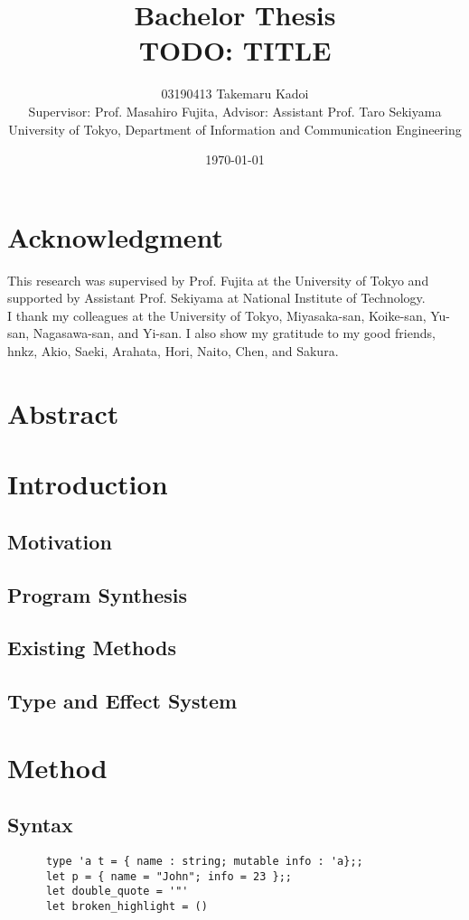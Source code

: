 \documentclass[12pt, a4paper, titlepage]{report}
\title{Bachelor Thesis \\ TODO: TITLE}
\author{
  03190413 Takemaru Kadoi
  \\[1cm]
  {\small Supervisor: Prof. Masahiro Fujita},
  {\small Advisor: Assistant Prof. Taro Sekiyama}
  \\[1cm]
  {\small University of Tokyo, Department of Information and Communication Engineering}
}
\date{\today}
\begin{document}
\maketitle
\newpage
\tableofcontents
\newpage

\chapter*{Acknowledgment}
This research was supervised by Prof. Fujita at the University of Tokyo and supported by Assistant Prof. Sekiyama at National Institute of Technology. \\
I thank my colleagues at the University of Tokyo, Miyasaka-san, Koike-san, Yu-san, Nagasawa-san, and Yi-san.
I also show my gratitude to my good friends, hnkz, Akio, Saeki, Arahata, Hori, Naito, Chen, and Sakura.

\chapter{Abstract} %
\cite{gulwani2017program}

\chapter{Introduction}
  \section{Motivation}
  \section{Program Synthesis}
  \section{Existing Methods}
  \section{Type and Effect System}

\chapter{Method} %
  \section{Syntax}
    \begin{verbatim}
      type 'a t = { name : string; mutable info : 'a};;
      let p = { name = "John"; info = 23 };;
      let double_quote = '"'
      let broken_highlight = ()
    \end{verbatim}
\end{document}
